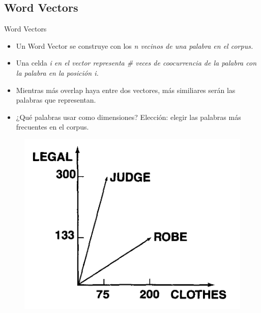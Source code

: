 \documentclass[xcolor=x11names,compress]{beamer}
\renewcommand{\(}{\begin{columns}}
\renewcommand{\)}{\end{columns}}
\newcommand{\<}[1]{\begin{column}{#1}}
\renewcommand{\>}{\end{column}}
\begin{document}
\subsection{Word Vectors}
\begin{frame}{Word Vectors}
\begin{itemize}
\item Un Word Vector se construye con los \em n \em vecinos de una palabra en el corpus.
\item Una celda \em i \em en el vector representa \# veces de coocurrencia de la palabra con la palabra en la posición \em i\em.
\item Mientras más overlap haya entre dos vectores, más similiares serán las palabras que representan.
\item ¿Qué palabras usar como dimensiones? Elección: elegir las palabras más frecuentes en el corpus.
\end{itemize}
\begin{figure}
\centering
\includegraphics[scale=0.24, keepaspectratio=True, natwidth=800,natheight=600]{word_vector.png}
\end{figure}
\end{frame}

\end{document}
